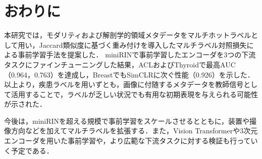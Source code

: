 \section{おわりに}
本研究では，モダリティおよび解剖学的領域メタデータをマルチホットラベルとして用い，Jaccard類似度に基づく重み付けを導入したマルチラベル対照損失による事前学習手法を提案した．
miniRINで事前学習したエンコーダを3つの下流タスクにファインチューニングした結果，ACLおよびThyroidで最高AUC（0.964，0.763）を達成し，BreastでもSimCLRに次ぐ性能（0.926）を示した．
以上より，疾患ラベルを用いずとも，画像に付随するメタデータを教師信号として活用することで，ラベルが乏しい状況でも有用な初期表現を与えられる可能性が示された．

今後は，miniRINを超える規模で事前学習をスケールさせるとともに，装置や撮像方向などを加えてマルチラベルを拡張する．また，Vision Transformerや3次元エンコーダを用いた事前学習や，より広範な下流タスクに対する検証も行っていく予定である．




